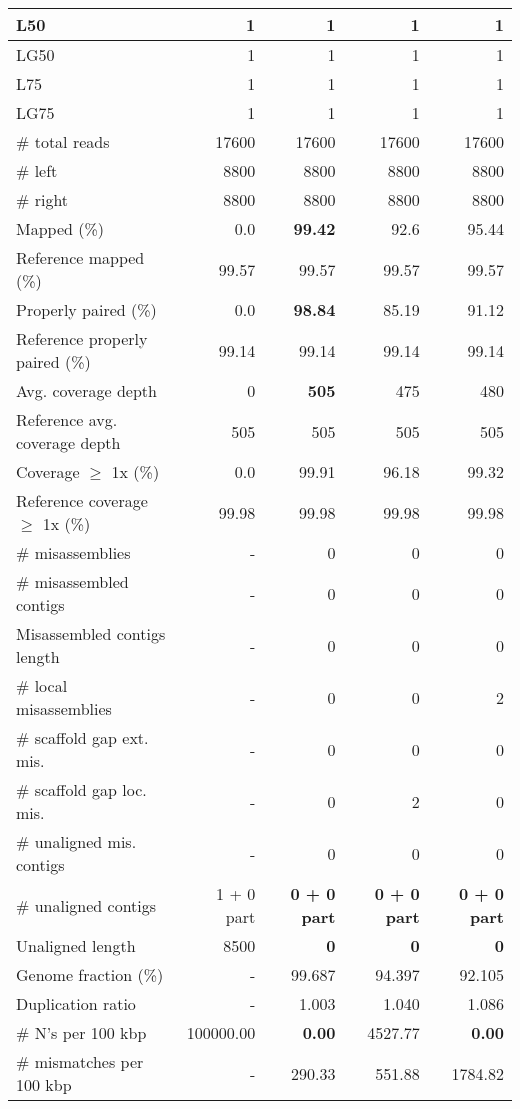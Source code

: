 \documentclass[12pt,a4paper]{article}
\begin{document}
\begin{table}[ht]
\begin{center}
\begin{tabular}{|l*{4}{|r}|}
L50 & 1 & 1 & 1 & 1 \\ \hline
LG50 & 1 & 1 & 1 & 1 \\ \hline
L75 & 1 & 1 & 1 & 1 \\ \hline
LG75 & 1 & 1 & 1 & 1 \\ \hline
\# total reads & 17600 & 17600 & 17600 & 17600 \\ \hline
\# left & 8800 & 8800 & 8800 & 8800 \\ \hline
\# right & 8800 & 8800 & 8800 & 8800 \\ \hline
Mapped (\%) & 0.0 & {\bf 99.42} & 92.6 & 95.44 \\ \hline
Reference mapped (\%) & 99.57 & 99.57 & 99.57 & 99.57 \\ \hline
Properly paired (\%) & 0.0 & {\bf 98.84} & 85.19 & 91.12 \\ \hline
Reference properly paired (\%) & 99.14 & 99.14 & 99.14 & 99.14 \\ \hline
Avg. coverage depth & 0 & {\bf 505} & 475 & 480 \\ \hline
Reference avg. coverage depth & 505 & 505 & 505 & 505 \\ \hline
Coverage $\geq$ 1x (\%) & 0.0 & 99.91 & 96.18 & 99.32 \\ \hline
Reference coverage $\geq$ 1x (\%) & 99.98 & 99.98 & 99.98 & 99.98 \\ \hline
\# misassemblies & - & 0 & 0 & 0 \\ \hline
\# misassembled contigs & - & 0 & 0 & 0 \\ \hline
Misassembled contigs length & - & 0 & 0 & 0 \\ \hline
\# local misassemblies & - & 0 & 0 & 2 \\ \hline
\# scaffold gap ext. mis. & - & 0 & 0 & 0 \\ \hline
\# scaffold gap loc. mis. & - & 0 & 2 & 0 \\ \hline
\# unaligned mis. contigs & - & 0 & 0 & 0 \\ \hline
\# unaligned contigs & 1 + 0 part & {\bf 0 + 0 part} & {\bf 0 + 0 part} & {\bf 0 + 0 part} \\ \hline
Unaligned length & 8500 & {\bf 0} & {\bf 0} & {\bf 0} \\ \hline
Genome fraction (\%) & - & 99.687 & 94.397 & 92.105 \\ \hline
Duplication ratio & - & 1.003 & 1.040 & 1.086 \\ \hline
\# N's per 100 kbp & 100000.00 & {\bf 0.00} & 4527.77 & {\bf 0.00} \\ \hline
\# mismatches per 100 kbp & - & 290.33 & 551.88 & 1784.82 \\ \hline

\end{tabular}
\end{center}
\end{table}
\end{document}
